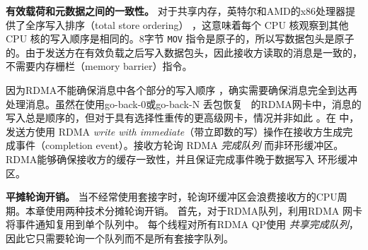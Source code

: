

\textbf {有效载荷和元数据之间的一致性。}
对于共享内存，英特尔和AMD的x86处理器提供了全序写入排序（total store ordering） \cite {sewell2010x86,intel-manual}，这意味着每个 CPU 核观察到其他 CPU 核的写入顺序是相同的。8字节 \texttt {MOV} 指令是原子的，所以写数据包头是原子的。由于发送方在有效负载之后写入数据包头，因此接收方读取的消息是一致的，不需要内存栅栏（memory barrier）指令。

因为RDMA不能确保消息中各个部分的写入顺序 \cite {infiniband2000infiniband}，确实需要确保消息完全到达再处理消息。虽然在使用go-back-0或go-back-N 丢包恢复~ \cite {dragojevic2014farm} 的RDMA网卡中，消息的写入总是顺序的，但对于具有选择性重传的更高级网卡，情况并非如此 \cite {mprdma,mittal2018revisiting}。在 \libipc {} 中，发送方使用 RDMA \textit {write with immediate}（带立即数的写）操作在接收方生成完成事件（completion event）。接收方轮询 RDMA \emph {完成队列} 而非环形缓冲区。RDMA能够确保接收方的缓存一致性，并且保证完成事件晚于数据写入 \libipc {} 环形缓冲区。


\textbf {平摊轮询开销。}
当不经常使用套接字时，轮询环缓冲区会浪费接收方的CPU周期。本章使用两种技术分摊轮询开销。
首先，对于RDMA队列，利用RDMA 网卡将事件通知复用到单个队列中。
每个线程对所有RDMA QP使用 \emph {共享完成队列}，因此它只需要轮询一个队列而不是所有套接字队列。


